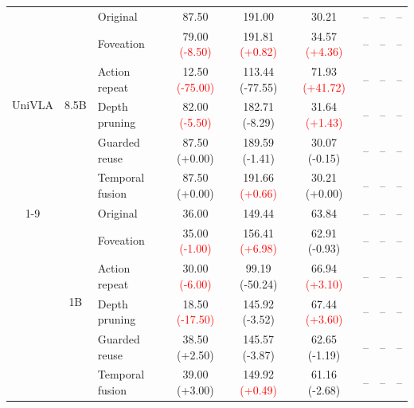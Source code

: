 \begin{table}[t]
\begin{tabular}{cclcccccc}
\multirow[c]{6}{*}{UniVLA}
& \multirow[c]{6}{*}{8.5B}
& Original & 87.50 & 191.00 & 30.21 & -- & -- & -- \\
& & Foveation & 79.00 {\scriptsize\textcolor{red}{(-8.50)}} & 191.81 {\scriptsize\textcolor{red}{(+0.82)}} & 34.57 {\scriptsize\textcolor{red}{(+4.36)}} & -- & -- & -- \\
& & Action repeat & 12.50 {\scriptsize\textcolor{red}{(-75.00)}} & 113.44 {\scriptsize\textcolor{green!50!black}{(-77.55)}} & 71.93 {\scriptsize\textcolor{red}{(+41.72)}} & -- & -- & -- \\
& & Depth pruning & 82.00 {\scriptsize\textcolor{red}{(-5.50)}} & 182.71 {\scriptsize\textcolor{green!50!black}{(-8.29)}} & 31.64 {\scriptsize\textcolor{red}{(+1.43)}} & -- & -- & -- \\
& & Guarded reuse & 87.50 {\scriptsize\textcolor{green!50!black}{(+0.00)}} & 189.59 {\scriptsize\textcolor{green!50!black}{(-1.41)}} & 30.07 {\scriptsize\textcolor{green!50!black}{(-0.15)}} & -- & -- & -- \\
& & Temporal fusion & 87.50 {\scriptsize\textcolor{green!50!black}{(+0.00)}} & 191.66 {\scriptsize\textcolor{red}{(+0.66)}} & 30.21 {\scriptsize\textcolor{green!50!black}{(+0.00)}} & -- & -- & -- \\
\cmidrule(lr){1-9}

\multirow[c]{6}{*}{MiniVLA}
& \multirow[c]{6}{*}{1B}
& Original & 36.00 & 149.44 & 63.84 & -- & -- & -- \\
& & Foveation & 35.00 {\scriptsize\textcolor{red}{(-1.00)}} & 156.41 {\scriptsize\textcolor{red}{(+6.98)}} & 62.91 {\scriptsize\textcolor{green!50!black}{(-0.93)}} & -- & -- & -- \\
& & Action repeat & 30.00 {\scriptsize\textcolor{red}{(-6.00)}} & 99.19 {\scriptsize\textcolor{green!50!black}{(-50.24)}} & 66.94 {\scriptsize\textcolor{red}{(+3.10)}} & -- & -- & -- \\
& & Depth pruning & 18.50 {\scriptsize\textcolor{red}{(-17.50)}} & 145.92 {\scriptsize\textcolor{green!50!black}{(-3.52)}} & 67.44 {\scriptsize\textcolor{red}{(+3.60)}} & -- & -- & -- \\
& & Guarded reuse & 38.50 {\scriptsize\textcolor{green!50!black}{(+2.50)}} & 145.57 {\scriptsize\textcolor{green!50!black}{(-3.87)}} & 62.65 {\scriptsize\textcolor{green!50!black}{(-1.19)}} & -- & -- & -- \\
& & Temporal fusion & 39.00 {\scriptsize\textcolor{green!50!black}{(+3.00)}} & 149.92 {\scriptsize\textcolor{red}{(+0.49)}} & 61.16 {\scriptsize\textcolor{green!50!black}{(-2.68)}} & -- & -- & -- \\
\bottomrule
\end{tabular}
\end{table}
